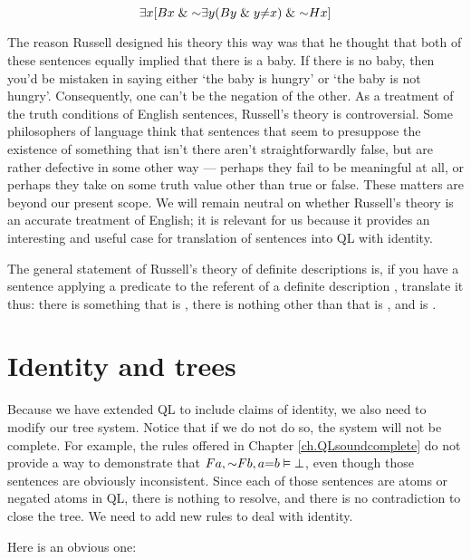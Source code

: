 \begin{equation*}
\qt{\exists}{x} [Bx \eand \enot \qt{\exists}{y} (By \eand y {\neq} x) \eand \enot Hx]
\end{equation*}

The reason Russell designed his theory this way was that he thought that both of these sentences equally implied that there is a baby. If there is no baby, then you'd be mistaken in saying either `the baby is hungry' or `the baby is not hungry'. Consequently, one can't be the negation of the other. As a treatment of the truth conditions of English sentences, Russell's theory is controversial. Some philosophers of language think that sentences that seem to presuppose the existence of something that isn't there aren't straightforwardly false, but are rather defective in some other way --- perhaps they fail to be meaningful at all, or perhaps they take on some truth value other than true or false. These matters are beyond our present scope. We will remain neutral on whether Russell's theory is an accurate treatment of English; it is relevant for us because it provides an interesting and useful case for translation of sentences into QL with identity.

The general statement of Russell's theory of definite descriptions is, if you have a sentence applying a predicate  to the referent of a definite description , translate it thus: there is something  that is , there is nothing other than  that is , and  is .


\section{Identity and trees}
\label{sec.identity.trees}

Because we have extended QL to include claims of identity, we also need to modify our tree system. Notice that if we do not do so, the system will not be complete. For example, the rules offered in Chapter \ref{ch.QLsoundcomplete} do not provide a way to demonstrate that $Fa, \enot Fb, a{=}b \models \bot$, even though those sentences are obviously inconsistent. Since each of those sentences are atoms or negated atoms in QL, there is nothing to resolve, and there is no contradiction to close the tree. We need to add new rules to deal with identity.

Here is an obvious one:


